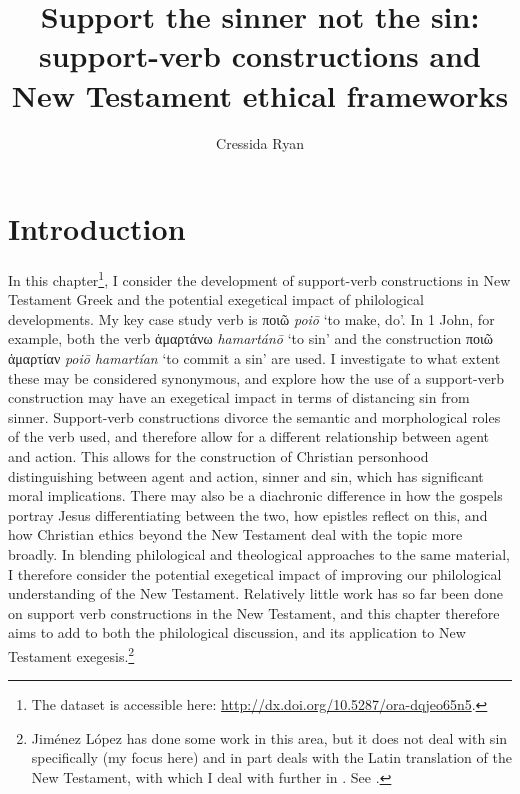 \documentclass[output=paper,colorlinks,citecolor=brown]{langscibook}
\author{Cressida Ryan\affiliation{University of Oxford}}
\title[Support the sinner not the sin]{Support the sinner not the sin: support-verb constructions and New Testament ethical frameworks}
\begin{document}
\maketitle


\hypertarget{introduction}{%
\section{Introduction}\label{introductionCR}}

In this chapter\footnote{The dataset is accessible here: \url{http://dx.doi.org/10.5287/ora-dqjeo65n5}.}, I consider the development of support-verb constructions
in New Testament Greek and the potential exegetical impact of
philological developments. My key case study verb is ποιῶ \textit{poiō} ‘to make, do'. 
In 1 John, for example, both the verb ἁμαρτάνω \textit{hamartánō} ‘to sin' and the construction ποιῶ ἁμαρτίαν \textit{poiō hamartían} ‘to commit a sin' are used. 
I investigate to what extent these may be considered synonymous, and
explore how the use of a support-verb construction may have an
exegetical impact in terms of distancing sin from sinner. 
Support-verb constructions divorce the semantic and morphological roles of the verb used, and therefore allow for a different relationship between agent and action. 
This allows for the construction of Christian personhood distinguishing between agent and action, sinner and sin, which has significant moral implications. 
There may also be a diachronic difference in how the gospels portray Jesus differentiating between the two, how epistles reflect on this, and how Christian ethics beyond the New Testament deal with the topic more broadly. 
In blending philological and theological approaches to the same material, I therefore consider the potential exegetical impact of improving our philological understanding of the New Testament.
Relatively little work has so far been done on support verb constructions in the New Testament, and this chapter therefore aims to add to both the philological discussion, and its application to New Testament exegesis.\footnote{Jiménez López has done some work in this area, but it does not deal with sin specifically (my focus here) and in part deals with the Latin translation of the New Testament, with which I deal with further in \citet{ryan_translating_2025}. See \citet{jimenez_lopez_colocaciones_2017, jimenez_lopez_colocaciones_2018, garcia2022translation}.}
\end{document}
